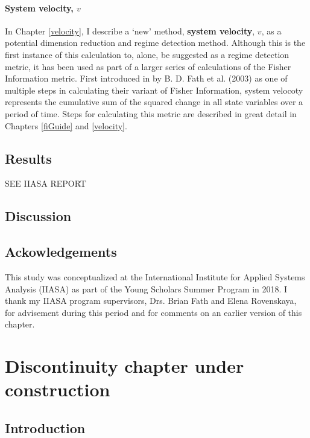 \documentclass[12pt,twoside,openany]{reedthesis}
\begin{document}
\subsubsection{\texorpdfstring{System velocity,
\(v\)}{System velocity, v}}\label{system-velocity-v}

In Chapter \ref{velocity}, I describe a `new' method, \textbf{system
velocity}, \(v\), as a potential dimension reduction and regime
detection method. Although this is the first instance of this
calculation to, alone, be suggested as a regime detection metric, it has
been used as part of a larger series of calculations of the Fisher
Information metric. First introduced in by B. D. Fath et al. (2003) as
one of multiple steps in calculating their variant of Fisher
Information, system velocoty represents the cumulative sum of the
squared change in all state variables over a period of time. Steps for
calculating this metric are described in great detail in Chapters
\ref{fiGuide} and \ref{velocity}.

\section{Results}\label{results-2}

SEE IIASA REPORT

\section{Discussion}\label{discussion-3}

\section{Ackowledgements}\label{ackowledgements}

This study was conceptualized at the International Institute for Applied
Systems Analysis (IIASA) as part of the Young Scholars Summer Program in
2018. I thank my IIASA program supervisors, Drs. Brian Fath and Elena
Rovenskaya, for advisement during this period and for comments on an
earlier version of this chapter.

\chapter{Discontinuity chapter under construction}\label{discontinuity}

\section{Introduction}\label{introduction-5}
\end{document}

